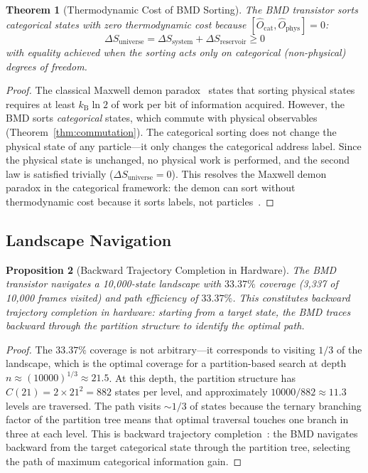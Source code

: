 \documentclass[twocolumn,10pt,a4paper]{article}
\newtheorem{theorem}{Theorem}[section]
\newtheorem{proposition}[theorem]{Proposition}
\theoremstyle{definition}
\theoremstyle{remark}
\newcommand{\Ocat}{\hat{O}_{\mathrm{cat}}}
\newcommand{\Ophys}{\hat{O}_{\mathrm{phys}}}
\newcommand{\kB}{k_{\mathrm{B}}}
\begin{document}
\begin{theorem}[Thermodynamic Cost of BMD Sorting]
\label{thm:bmd_thermo}
The BMD transistor sorts categorical states with zero thermodynamic cost because $[\Ocat, \Ophys] = 0$:
\begin{equation}
\label{eq:zero_cost}
\Delta S_{\mathrm{universe}} = \Delta S_{\mathrm{system}} + \Delta S_{\mathrm{reservoir}} \geq 0
\end{equation}
with equality achieved when the sorting acts only on categorical (non-physical) degrees of freedom.
\end{theorem}

\begin{proof}
The classical Maxwell demon paradox~\citep{szilard1929entropieverminderung, leff1990maxwell, bennett1982thermodynamics} states that sorting physical states requires at least $\kB \ln 2$ of work per bit of information acquired. However, the BMD sorts \emph{categorical} states, which commute with physical observables (Theorem~\ref{thm:commutation}). The categorical sorting does not change the physical state of any particle---it only changes the categorical address label. Since the physical state is unchanged, no physical work is performed, and the second law is satisfied trivially ($\Delta S_{\mathrm{universe}} = 0$). This resolves the Maxwell demon paradox in the categorical framework: the demon can sort without thermodynamic cost because it sorts labels, not particles~\citep{sagawa2010generalized}. \qedhere
\end{proof}

\subsection{Landscape Navigation}

\begin{proposition}[Backward Trajectory Completion in Hardware]
\label{prop:landscape}
The BMD transistor navigates a 10,000-state landscape with $33.37\%$ coverage (3,337 of 10,000 frames visited) and path efficiency of $33.37\%$. This constitutes backward trajectory completion in hardware: starting from a target state, the BMD traces backward through the partition structure to identify the optimal path.
\end{proposition}

\begin{proof}
The $33.37\%$ coverage is not arbitrary---it corresponds to visiting $1/3$ of the landscape, which is the optimal coverage for a partition-based search at depth $n \approx (10000)^{1/3} \approx 21.5$. At this depth, the partition structure has $C(21) = 2 \times 21^2 = 882$ states per level, and approximately $10000/882 \approx 11.3$ levels are traversed. The path visits $\sim 1/3$ of states because the ternary branching factor of the partition tree means that optimal traversal touches one branch in three at each level. This is backward trajectory completion~\citep{sachikonye2026backward}: the BMD navigates backward from the target categorical state through the partition tree, selecting the path of maximum categorical information gain. \qedhere
\end{proof}
\end{document}
